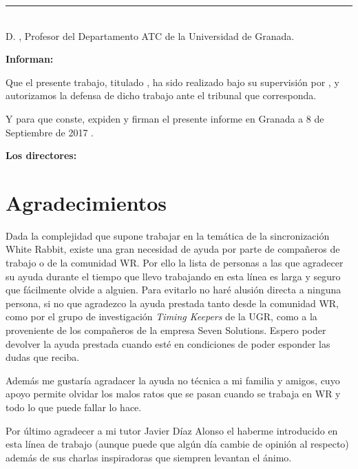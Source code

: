 \noindent\rule[-1ex]{\textwidth}{2pt}\\[4.5ex]

D. \textbf{\myProf}, Profesor del Departamento ATC de la Universidad de Granada.

\vspace{0.5cm}

\textbf{Informan:}

\vspace{0.5cm}

Que el presente trabajo, titulado \textit{\textbf{\myTitle}},
ha sido realizado bajo su supervisión por \textbf{\myName}, y autorizamos la 
defensa de dicho trabajo ante el tribunal que corresponda.

\vspace{0.5cm}

Y para que conste, expiden y firman el presente informe en Granada a 8 de 
Septiembre de 2017 .

\vspace{1cm}

\textbf{Los directores:}

\vspace{5cm}

\noindent \textbf{\myProf}

\chapter*{Agradecimientos}
\thispagestyle{empty}

       \vspace{1cm}


Dada la complejidad que supone trabajar en la temática de la sincronización 
White Rabbit, existe una gran necesidad de ayuda por parte de compañeros de 
trabajo o de la comunidad WR. Por ello la lista de personas a las que agradecer 
su ayuda durante el tiempo que llevo trabajando en esta línea es larga y seguro 
que fácilmente olvide a alguien. Para evitarlo no haré alusión directa a 
ninguna persona, si no que agradezco la ayuda prestada tanto desde la comunidad 
WR, como por el grupo de investigación \textit{Timing Keepers} de la UGR, como 
a la proveniente de los compañeros de la empresa Seven Solutions. Espero poder 
devolver la ayuda prestada cuando esté en condiciones de poder esponder las 
dudas que reciba.

Además me gustaría agradacer la ayuda no técnica a mi familia y amigos, cuyo 
apoyo permite olvidar los malos ratos que se pasan cuando se trabaja en WR y 
todo lo que puede fallar lo hace.

Por último agradecer a mi tutor Javier Díaz Alonso el haberme introducido en 
esta línea de trabajo (aunque puede que algún día cambie de opinión al 
respecto) además de sus charlas inspiradoras que siempren levantan el ánimo.

